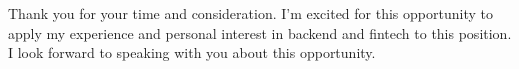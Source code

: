 \documentclass[11pt, letter]{awesome-cv}
\begin{document}
\begin{cvletter}



Thank you for your time and consideration.
I'm excited for this opportunity to apply my experience and 
personal interest in backend and fintech
to this position. I look forward to speaking with you about this opportunity.

\end{cvletter}


\makeletterclosing
\end{document}
